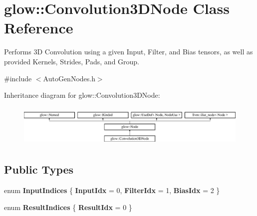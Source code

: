 \hypertarget{classglow_1_1_convolution3_d_node}{}\section{glow\+:\+:Convolution3\+D\+Node Class Reference}
\label{classglow_1_1_convolution3_d_node}


Performs 3D Convolution using a given Input, Filter, and Bias tensors, as well as provided Kernels, Strides, Pads, and Group.  




{\ttfamily \#include $<$Auto\+Gen\+Nodes.\+h$>$}

Inheritance diagram for glow\+:\+:Convolution3\+D\+Node\+:\begin{figure}[H]
\begin{center}
\leavevmode
\includegraphics[height=2.028986cm]{classglow_1_1_convolution3_d_node}
\end{center}
\end{figure}
\subsection*{Public Types}
\begin{DoxyCompactItemize}
\item 
\mbox{\label{classglow_1_1_convolution3_d_node_a09faf1d81dc3eeffae499a36b638156a}} 
enum {\bfseries Input\+Indices} \{ {\bfseries Input\+Idx} = 0, 
{\bfseries Filter\+Idx} = 1, 
{\bfseries Bias\+Idx} = 2
 \}
\item 
\mbox{\label{classglow_1_1_convolution3_d_node_a98ee55181256e51e10807356053a3352}} 
enum {\bfseries Result\+Indices} \{ {\bfseries Result\+Idx} = 0
 \}
\end{DoxyCompactItemize}
